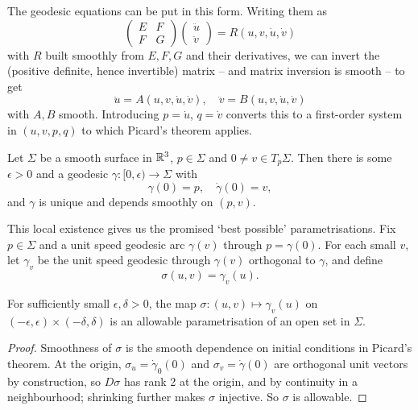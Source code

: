 \documentclass[a4paper]{scrartcl}
\begin{document}
The geodesic equations can be put in this form. Writing them as
$$
\begin{pmatrix} E & F \\ F & G \end{pmatrix}\begin{pmatrix} \ddot u \\ \ddot v \end{pmatrix} = R(u, v, \dot u, \dot v)
$$
with $R$ built smoothly from $E, F, G$ and their derivatives, we can invert the (positive definite, hence invertible) matrix -- and matrix inversion is smooth -- to get
$$
\ddot u = A(u, v, \dot u, \dot v), \quad \ddot v = B(u, v, \dot u, \dot v)
$$
with $A, B$ smooth. Introducing $p = \dot u$, $q = \dot v$ converts this to a first-order system in $(u, v, p, q)$ to which Picard's theorem applies.

\begin{corollary}\label{cor:geodesicexistence}
    Let $\Sigma$ be a smooth surface in $\mathbb{R}^3$, $p \in \Sigma$ and $0 \neq v \in T_p\Sigma$. Then there is some $\epsilon > 0$ and a geodesic $\gamma: [0, \epsilon) \rightarrow \Sigma$ with
    $$
    \gamma(0) = p, \quad \dot\gamma(0) = v,
    $$
    and $\gamma$ is unique and depends smoothly on $(p, v)$.
\end{corollary}

This local existence gives us the promised `best possible' parametrisations. Fix $p \in \Sigma$ and a unit speed geodesic arc $\gamma(v)$ through $p = \gamma(0)$. For each small $v$, let $\gamma_v$ be the unit speed geodesic through $\gamma(v)$ orthogonal to $\gamma$, and define
$$
\sigma(u, v) = \gamma_v(u).
$$

\begin{lemma}
    For sufficiently small $\epsilon, \delta > 0$, the map $\sigma: (u, v) \mapsto \gamma_v(u)$ on $(-\epsilon,\epsilon) \times (-\delta, \delta)$ is an allowable parametrisation of an open set in $\Sigma$.
\end{lemma}
\begin{proof}
    Smoothness of $\sigma$ is the smooth dependence on initial conditions in Picard's theorem. At the origin, $\sigma_u = \dot\gamma_0(0)$ and $\sigma_v = \dot\gamma(0)$ are orthogonal unit vectors by construction, so $D\sigma$ has rank 2 at the origin, and by continuity in a neighbourhood; shrinking further makes $\sigma$ injective. So $\sigma$ is allowable.
\end{proof}
\end{document}
